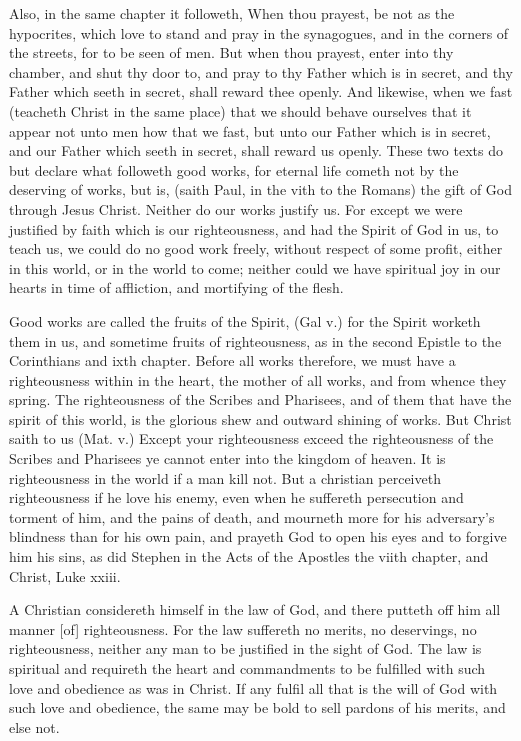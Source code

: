 Also, in the same chapter it followeth, When thou prayest, 
be not as the hypocrites, which love to stand and pray in the 
synagogues, and in the corners of the streets, for to be seen 
of men. But when thou prayest, enter into thy chamber, 
and shut thy door to, and pray to thy Father which is in 
secret, and thy Father which seeth in secret, shall reward 
thee openly. And likewise, when we fast (teacheth Christ 
in the same place) that we should behave ourselves that it 
appear not unto men how that we fast, but unto our Father 
which is in secret, and our Father which seeth in secret, 
shall reward us openly. These two texts do but declare 
what followeth good works, for eternal life cometh not by 
the deserving of works, but is, (saith Paul, in the vith to 
the Romans) the gift of God through Jesus Christ. Neither
do our works justify us. For except we were justified 
by faith which is our righteousness, and had the Spirit 
of God in us, to teach us, we could do no good work 
freely, without respect of some profit, either in this world, 
or in the world to come; neither could we have spiritual 
joy in our hearts in time of affliction, and mortifying of 
the flesh. 

Good works are called the fruits of the Spirit, (Gal v.) 
for the Spirit worketh them in us, and sometime fruits of 
righteousness, as in the second Epistle to the Corinthians 
and ixth chapter. Before all works therefore, we must have 
a righteousness within in the heart, the mother of all works, 
and from whence they spring. The righteousness of the 
Scribes and Pharisees, and of them that have the spirit of 
this world, is the glorious shew and outward shining of 
works. But Christ saith to us (Mat. v.) Except your 
righteousness exceed the righteousness of the Scribes and 
Pharisees ye cannot enter into the kingdom of heaven. It 
is righteousness in the world if a man kill not. But a christian
perceiveth righteousness if he love his enemy, even 
when he suffereth persecution and torment of him, and the 
pains of death, and mourneth more for his adversary's 
blindness than for his own pain, and prayeth God to open 
his eyes and to forgive him his sins, as did Stephen in the 
Acts of the Apostles the viith chapter, and Christ, Luke 
xxiii.

A Christian considereth himself in the law of God, 
and there putteth off him all manner [of] righteousness. 
For the law suffereth no merits, no deservings, no righteousness,
neither any man to be justified in the sight of 
God. The law is spiritual and requireth the heart and 
commandments to be fulfilled with such love and obedience 
as was in Christ. If any fulfil all that is the will of God 
with such love and obedience, the same may be bold to 
sell pardons of his merits, and else not. 


